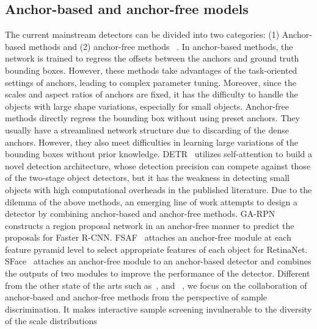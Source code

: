 \documentclass[journal]{IEEEtran}
\begin{document}
\subsection{Anchor-based and anchor-free models} 
The current mainstream detectors can be divided into two categories: (1) Anchor-based methods \cite{girshick2015fast, ren2016faster,lin2017focal,redmon2016you} and (2) anchor-free methods ~\cite{law2018cornernet, zhou2019objects,tian2019fcos}. 
In anchor-based methods, the network is trained to regress the offsets between the anchors and ground truth bounding boxes. However, these methods take advantages of the task-oriented settings of anchors, leading to complex parameter tuning. Moreover, since the scales and aspect ratios of anchors are fixed, it has the difficulty to
handle the objects with large shape variations, especially for small objects.  Anchor-free methods directly regress the bounding box without using preset anchors. They usually have a streamlined network structure due to discarding of the dense anchors. However, they also meet difficulties in learning large variations of the bounding boxes without prior knowledge. DETR~\cite{DETR} utilizes self-attention to build a novel detection architecture, whose detection precision can compete against those of the two-stage object detectors, but it has the weakness in detecting small objects with high computational overheads in the published literature. Due to the dilemma of the above methods, an emerging line of work attempts to design a detector by combining anchor-based and anchor-free methods. GA-RPN~\cite{wang2019region} constructs a region proposal network in an anchor-free manner to predict the proposals for Faster R-CNN. FSAF~\cite{zhu2019feature} attaches an anchor-free module at each feature pyramid level to select appropriate features of each object for RetinaNet. SFace~\cite{wang2018sface} attaches an anchor-free module to an anchor-based detector and combines the outputs of two modules to improve the performance of the detector. Different from the other state of the arts such as~\cite{wang2019region}, \cite{zhu2019feature} and ~\cite{wang2018sface}, we focus on the collaboration of anchor-based and anchor-free methods from the perspective of sample discrimination. It makes interactive sample screening invulnerable to the diversity of the scale distributions
\end{document}
